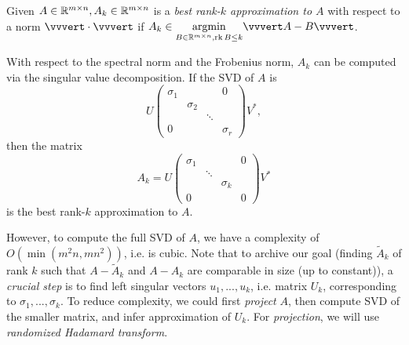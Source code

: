\begin{definition}
\begin{mdframed}
Given $A\in \mathbb{R}^{m \times n}, A_k \in \mathbb{R}^{m\times n}$ is a \emph{best rank-$k$ approximation to $A$} with respect to a norm $\vvvert \cdot \vvvert$ if $A_k\in \underset{B\in \R^{m \times n}, \operatorname{rk} B\leq k}{\operatorname{argmin}}\vvvert A-B\vvvert$.
\end{mdframed}
\end{definition} \vspace{-1pc}
\begin{remark*} With respect to the spectral norm and the Frobenius norm, $A_k$ can be computed via the singular value decomposition. If the SVD of $A$ is 
$$
U\begin{pmatrix}
\sigma_1 &    			&    & 0 \\
	           &\sigma_2	&	  &	\\
	           &				&	\ddots & \\
	0           &				&	 & \sigma_r
\end{pmatrix}V^*,
$$
then the matrix
$$
A_k = U\begin{pmatrix}
\sigma_1 &    			&    & 0 \\
	           &\ddots	&	  &	\\
	           &				&	\sigma_k & \\
	0           &				&	 & 0
\end{pmatrix}V^*
$$
is the best rank-$k$ approximation to $A$.
\end{remark*}
However, to compute the full SVD of $A$, we have a complexity of $O(\min(m^2n,mn^2))$, i.e. is cubic. Note that to archive our goal (finding $\tilde{A}_k$ of rank $k$ such that $A-\tilde{A}_k$ and $A-A_k$ are comparable in size (up to constant)), a \emph{crucial step} is to find left singular vectors $u_1,...,u_k$, i.e. matrix $U_k$, corresponding to $\sigma_1,...,\sigma_k$. To reduce complexity, we could first \emph{project} $A$, then compute SVD of the smaller matrix, and infer approximation of $U_k$. For \emph{projection}, we will use \emph{randomized Hadamard transform}.

